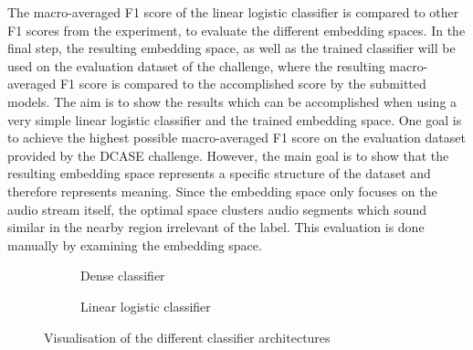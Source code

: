 \newline
\newline
The macro-averaged F1 score of the linear logistic classifier is compared to other F1 scores from the experiment, to evaluate the different embedding spaces. 
\newline
\newline
In the final step, the resulting embedding space, as well as the trained classifier will be used on the evaluation dataset of the challenge, where the resulting macro-averaged F1 score is compared to the accomplished score by the submitted models. The aim is to show the results which can be accomplished when using a very simple linear logistic classifier and the trained embedding space.
\newline
\newline
One goal is to achieve the highest possible macro-averaged F1 score on the evaluation dataset provided by the DCASE challenge. 
\newline
\newline
However, the main goal is to show that the resulting embedding space represents a specific structure of the dataset and therefore represents meaning. Since the embedding space only focuses on the audio stream itself, the optimal space clusters audio segments which sound similar in the nearby region irrelevant of the label. This evaluation is done manually by examining the embedding space.
\begin{figure}[htbp]
\centering
\begin{subfigure}{.5\linewidth}
  \centering
  \caption{Dense classifier}
  \label{fig:dense-classifier}
\end{subfigure}%
\begin{subfigure}{.5\linewidth}
  \centering
  \caption{Linear logistic classifier}
  \label{fig:logistic-classifier}
\end{subfigure}
\caption{Visualisation of the different classifier architectures}
\label{fig:Classifier-DCASE-Visualisation}
\end{figure}

